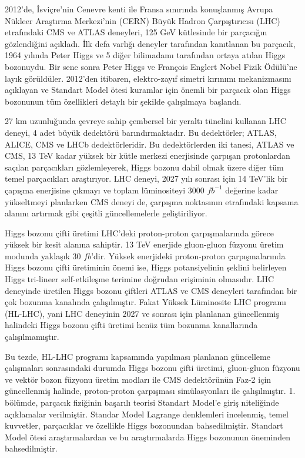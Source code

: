 2012’de, İsviçre’nin  Cenevre  kenti  ile  Fransa  sınırında  konuşlanmış  Avrupa Nükleer Araştırma Merkezi’nin (CERN) Büyük Hadron Çarpıştırıcısı (LHC) etrafındaki CMS  ve  ATLAS  deneyleri, 125 GeV kütlesinde bir parçacığın gözlendiğini açıkladı. İlk defa varlığı deneyler tarafından kanıtlanan bu parçacık, 1964 yılında Peter Higgs ve 5 diğer bilimadamı tarafından ortaya atılan Higgs bozonuydu. Bir sene sonra Peter Higgs ve François Englert Nobel Fizik Ödülü'ne layık görüldüler. 2012'den itibaren, elektro-zayıf simetri kırınımı mekanizmasını açıklayan ve Standart Model ötesi kuramlar için önemli bir parçacık olan Higgs bozonunun tüm özellikleri detaylı bir şekilde çalışılmaya başlandı.

27 km uzunluğunda çevreye sahip çembersel bir yeraltı tünelini kullanan LHC deneyi, 4 adet büyük dedektörü barındırmaktadır. Bu dedektörler; ATLAS, ALICE, CMS ve LHCb dedektörleridir. Bu dedektörlerden iki tanesi, ATLAS ve CMS, 13 TeV kadar yüksek bir kütle merkezi enerjisinde çarpışan protonlardan saçılan parçacıkları gözlemleyerek, Higgs bozonu dahil olmak üzere diğer tüm temel parçacıkları araştırıyor. LHC deneyi, 2027 yılı sonrası için 14 TeV'lik bir çapışma enerjisine çıkmayı ve toplam lüminositeyi 3000 $fb^{-1}$ değerine kadar yükseltmeyi planlarken CMS deneyi de, çarpışma noktasının etrafındaki kapsama alanını artırmak gibi çeşitli güncellemelerle geliştiriliyor.

Higgs bozonu çifti üretimi LHC'deki proton-proton çarpışmalarında görece yüksek bir kesit alanına sahiptir. 13 TeV enerjide gluon-gluon füzyonu üretim modunda yaklaşık 30 $fb$'dir. Yüksek enerjideki proton-proton çarpışmalarında Higgs bozonu çifti üretiminin önemi ise, Higgs potansiyelinin şeklini belirleyen Higgs tri-lineer self-etkileşme terimine doğrudan erişiminin olmasıdır. LHC deneyinde üretilen Higgs bozonu çiftleri ATLAS ve CMS deneyleri tarafından bir çok bozunma kanalında çalışılmıştır. Fakat Yüksek Lüminosite LHC programı (HL-LHC), yani LHC deneyinin 2027 ve sonrası için planlanan güncellenmiş halindeki Higgs bozonu çifti üretimi henüz tüm bozunma kanallarında çalışılmamıştır.

Bu tezde, HL-LHC programı kapsamında yapılması planlanan güncelleme çalışmaları sonrasındaki durumda Higgs bozonu çifti üretimi, gluon-gluon füzyonu ve vektör bozon füzyonu üretim modları ile CMS dedektörünün Faz-2 için güncellenmiş halinde, proton-proton çarpışması simülasyonları ile çalışılmıştır. 1. bölümde, parçacık fiziğinin başarılı teorisi Standart Model'e giriş niteliğinde açıklamalar verilmiştir. Standar Model Lagrange denklemleri incelenmiş, temel kuvvetler, parçacıklar ve özellikle Higgs bozonundan bahsedilmiştir. Standart Model ötesi araştırmalardan ve bu araştırmalarda Higgs bozonunun öneminden bahsedilmiştir.

